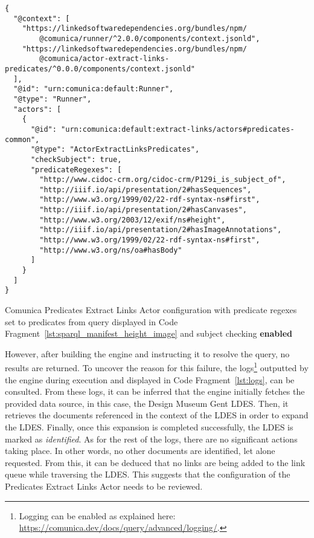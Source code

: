 \begin{listing}[htbp]
    \begin{verbatim}
{
  "@context": [
    "https://linkedsoftwaredependencies.org/bundles/npm/
        @comunica/runner/^2.0.0/components/context.jsonld",
    "https://linkedsoftwaredependencies.org/bundles/npm/
        @comunica/actor-extract-links-predicates/^0.0.0/components/context.jsonld"
  ],
  "@id": "urn:comunica:default:Runner",
  "@type": "Runner",
  "actors": [
    {
      "@id": "urn:comunica:default:extract-links/actors#predicates-common",
      "@type": "ActorExtractLinksPredicates",
      "checkSubject": true,
      "predicateRegexes": [
        "http://www.cidoc-crm.org/cidoc-crm/P129i_is_subject_of",
        "http://iiif.io/api/presentation/2#hasSequences",
        "http://www.w3.org/1999/02/22-rdf-syntax-ns#first",
        "http://iiif.io/api/presentation/2#hasCanvases",
        "http://www.w3.org/2003/12/exif/ns#height",
        "http://iiif.io/api/presentation/2#hasImageAnnotations",
        "http://www.w3.org/1999/02/22-rdf-syntax-ns#first",
        "http://www.w3.org/ns/oa#hasBody"
      ]
    }
  ]
}
    \end{verbatim}
    \caption{Comunica Predicates Extract Links Actor configuration with predicate regexes set to predicates from query displayed in Code Fragment~\ref{lst:sparql_manifest_height_image} and subject checking \textbf{enabled}}
    \label{lst:actor_config_regexes_subject_true}
\end{listing}

However, after building the engine and instructing it to resolve the query, no results are returned. To uncover the reason for this failure, the logs\footnote{Logging can be enabled as explained here: \href{https://comunica.dev/docs/query/advanced/logging/}{https://comunica.dev/docs/query/advanced/logging/}.} outputted by the engine during execution and displayed in Code Fragment~\ref{lst:logs}, can be consulted. From these logs, it can be inferred that the engine initially fetches the provided data source, in this case, the Design Museum Gent LDES. Then, it retrieves the documents referenced in the context of the LDES in order to expand the LDES. Finally, once this expansion is completed successfully, the LDES is marked as \textit{identified}. As for the rest of the logs, there are no significant actions taking place. In other words, no other documents are identified, let alone requested. From this, it can be deduced that no links are being added to the link queue while traversing the LDES. This suggests that the configuration of the Predicates Extract Links Actor needs to be reviewed.

